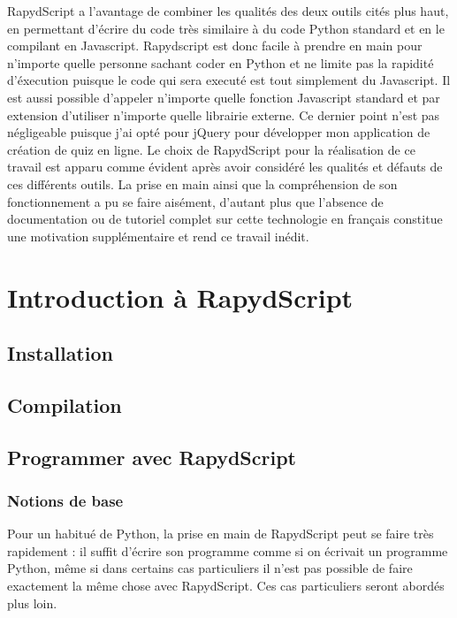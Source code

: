 \documentclass[letterpaper,10pt,french]{sphinxmanual}
\begin{document}
RapydScript a l'avantage de combiner les qualités des deux outils cités plus haut, en permettant d'écrire du code très similaire à du code Python standard et en le compilant en Javascript. Rapydscript est donc facile à prendre en main pour n'importe quelle personne sachant coder en Python et ne limite pas la rapidité d'éxecution puisque le code qui sera executé est tout simplement du Javascript. Il est aussi possible d'appeler n'importe quelle fonction Javascript standard et par extension d'utiliser n'importe quelle librairie externe. Ce dernier point n'est pas négligeable puisque j'ai opté pour jQuery pour développer mon application de création de quiz en ligne. Le choix de RapydScript pour la réalisation de ce travail est apparu comme évident après avoir considéré les qualités et défauts de ces différents outils. La prise en main ainsi que la compréhension de son fonctionnement a pu se faire aisément, d'autant plus que l'absence de documentation ou de tutoriel complet sur cette technologie en français constitue une motivation supplémentaire et rend ce travail inédit.


\chapter{Introduction à RapydScript}
\label{rapydscript:introduction-a-rapydscript}

\section{Installation}
\label{rapydscript:installation}

\section{Compilation}
\label{rapydscript:compilation}

\section{Programmer avec RapydScript}
\label{rapydscript:programmer-avec-rapydscript}

\subsection{Notions de base}
\label{rapydscript:notions-de-base}
Pour un habitué de Python, la prise en main de RapydScript peut se faire très rapidement : il suffit d'écrire son programme comme si on écrivait un programme Python, même si dans certains cas particuliers il n'est pas possible de faire exactement la même chose avec RapydScript. Ces cas particuliers seront abordés plus loin.
\end{document}
